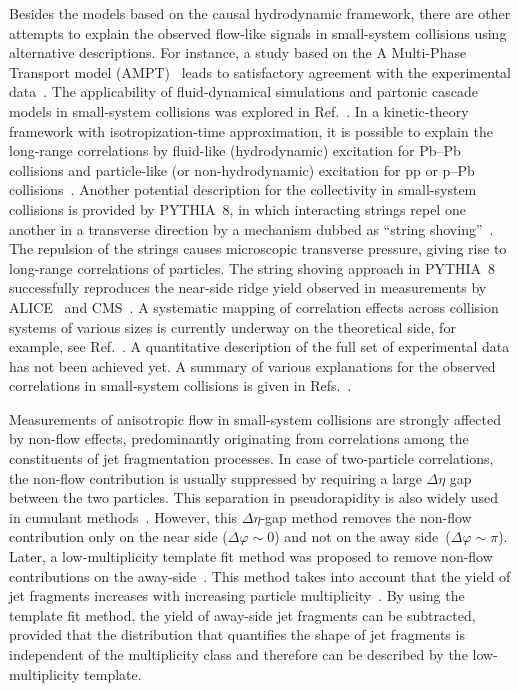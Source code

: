 Besides the models based on the causal hydrodynamic framework, there are other attempts to explain the observed flow-like signals in small-system collisions using alternative descriptions. 
For instance, a study based on the A Multi-Phase Transport model (AMPT)~\cite{Lin:2004en} leads to satisfactory agreement with the experimental data~\cite{OrjuelaKoop:2015jss}. The applicability of fluid-dynamical simulations and partonic cascade models in small-system collisions was explored in Ref.~\cite{Gallmeister:2018mcn}. In a kinetic-theory framework with isotropization-time approximation, it is possible to explain the long-range correlations by fluid-like (hydrodynamic) excitation for Pb--Pb collisions and particle-like (or non-hydrodynamic) excitation for pp or p--Pb collisions~\cite{Kurkela:2019kip,Kurkela:2020wwb,Ambrus:2021fej}. Another potential description for the collectivity in small-system collisions is provided by PYTHIA~8, in which interacting strings repel one another in a transverse direction by a mechanism dubbed as ``string shoving''~\cite{Bierlich:2017vhg,Bierlich:2019ixq}. The repulsion of the strings causes microscopic transverse pressure, giving rise to long-range correlations of particles. The string shoving approach in PYTHIA~8 successfully reproduces the near-side ridge yield observed in measurements by ALICE~\cite{ALICE:2021nir} and CMS~\cite{Khachatryan:2016txc}. A systematic mapping of correlation effects across collision systems of various sizes is currently underway on the theoretical side, for example, see Ref.~\cite{Schenke:2020mbo}. A quantitative description of the full set of experimental data has not been achieved yet. A summary of various explanations for the observed correlations in small-system collisions is given in Refs.~\cite{Strickland:2018exs,Loizides:2016tew,Nagle:2018nvi}. 

Measurements of anisotropic flow in small-system collisions are strongly affected by non-flow effects, predominantly originating from correlations among the constituents of jet fragmentation processes.
In case of two-particle correlations, the non-flow contribution is usually suppressed by requiring a large $\Delta\eta$ gap between the two particles. This separation in pseudorapidity is also widely used in cumulant methods~\cite{Bilandzic:2010jr, Acharya:2019vdf}. However, this $\Delta\eta$-gap method removes the non-flow contribution only on the near side ($\Delta\varphi\sim0$) and not on the away side~($\Delta\varphi\sim\pi$). Later, a low-multiplicity template fit method was proposed to remove non-flow contributions on the away-side~\cite{ATLAS:2015hzw, ATLAS:2016yzd, ATLAS:2018ngv}. This method takes into account that the yield of jet fragments increases with increasing particle multiplicity~\cite{CMS:2013ycn, ALICE:2013tla, ALICE:2014mas}.
By using the template fit method, the yield of away-side jet fragments can be subtracted, provided that the distribution that quantifies the shape of jet fragments is independent of the multiplicity class and therefore can be described by the low-multiplicity template.

